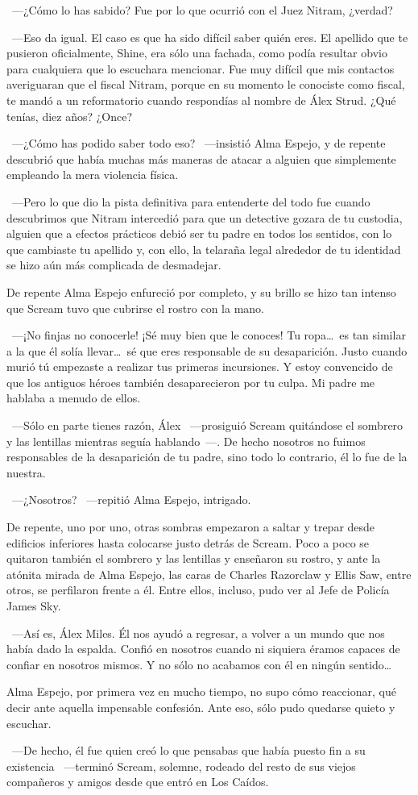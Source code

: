 ~---¿Cómo lo has sabido? Fue por lo que ocurrió con el Juez Nitram, ¿verdad?

~---Eso da igual. El caso es que ha sido difícil saber quién eres. El apellido que te pusieron oficialmente, Shine, era sólo una fachada, como podía resultar obvio para cualquiera que lo escuchara mencionar. Fue muy difícil que mis contactos averiguaran que el fiscal Nitram, porque en su momento le conociste como fiscal, te mandó a un reformatorio cuando respondías al nombre de Álex Strud. ¿Qué tenías, diez años? ¿Once?

~---¿Cómo has podido saber todo eso? ~---insistió Alma Espejo, y de repente descubrió que había muchas más maneras de atacar a alguien que simplemente empleando la mera violencia física.

~---Pero lo que dio la pista definitiva para entenderte del todo fue cuando descubrimos que Nitram intercedió para que un detective gozara de tu custodia, alguien que a efectos prácticos debió ser tu padre en todos los sentidos, con lo que cambiaste tu apellido y, con ello, la telaraña legal alrededor de tu identidad se hizo aún más complicada de desmadejar.

De repente Alma Espejo enfureció por completo, y su brillo se hizo tan intenso que Scream tuvo que cubrirse el rostro con la mano.

~---¡No finjas no conocerle! ¡Sé muy bien que le conoces! Tu ropa\dots\ es tan similar a la que él solía llevar\dots\ sé que eres responsable de su desaparición. Justo cuando murió tú empezaste a realizar tus primeras incursiones. Y estoy convencido de que los antiguos héroes también desaparecieron por tu culpa. Mi padre me hablaba a menudo de ellos.

~---Sólo en parte tienes razón, Álex ~---prosiguió Scream quitándose el sombrero y las lentillas mientras seguía hablando~---. De hecho nosotros no fuimos responsables de la desaparición de tu padre, sino todo lo contrario, él lo fue de la nuestra.

~---¿Nosotros? ~---repitió Alma Espejo, intrigado.

De repente, uno por uno, otras sombras empezaron a saltar y trepar desde edificios inferiores hasta colocarse justo detrás de Scream. Poco a poco se quitaron también el sombrero y las lentillas y enseñaron su rostro, y ante la atónita mirada de Alma Espejo, las caras de Charles Razorclaw y Ellis Saw, entre otros, se perfilaron frente a él. Entre ellos, incluso, pudo ver al Jefe de Policía James Sky.

~---Así es, Álex Miles. Él nos ayudó a regresar, a volver a un mundo que nos había dado la espalda. Confió en nosotros cuando ni siquiera éramos capaces de confiar en nosotros mismos. Y no sólo no acabamos con él en ningún sentido\dots

Alma Espejo, por primera vez en mucho tiempo, no supo cómo reaccionar, qué decir ante aquella impensable confesión. Ante eso, sólo pudo quedarse quieto y escuchar.

~---De hecho, él fue quien creó lo que pensabas que había puesto fin a su existencia ~---terminó Scream, solemne, rodeado del resto de sus viejos compañeros y amigos desde que entró en Los Caídos.

\endinput
